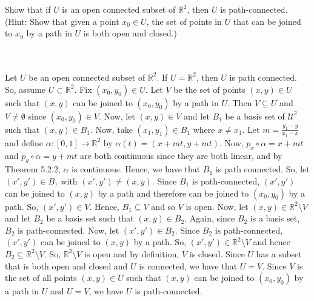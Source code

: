 Show that if $U$ is an open connected subset of $\mathbb{R}^2$, then $U$ is path-connected.
(Hint: Show that given a point $x_0\in U$, the set of points in $U$ that can be joined to $x_0$ by a
path in $U$ is both open and closed.)\\\\


\begin{solution}\renewcommand{\qedsymbol}{}\ \\
    Let $U$ be an open connected subset of $\mathbb{R}^2$. If $U=\mathbb{R}^2$, then $U$ is path
    connected. So, assume $U\subset\mathbb{R}^2$. Fix $(x_0,y_0)\in U$. Let $V$ be the set of points
    $(x,y)\in U$ such that $(x,y)$ can be joined to $(x_0,y_0)$ by a path in $U$. Then $V\subseteq U$
    and $V\neq\emptyset$ since $(x_0,y_0)\in V$. Now, let $(x,y)\in V$ and let $B_1$ be a basis set of
    $\mathcal{U}^2$ such that $(x,y)\in B_1$. Now, take $(x_1,y_1)\in B_1$ where $x\neq x_1$. Let
    $m=\frac{y_1-y}{x_1-x}$ and define $\alpha:[0,1]\rightarrow\mathbb{R}^2$ by $\alpha(t)=(x+mt,y+mt)$.
    Now, $p_x\circ\alpha=x+mt$ and $p_y\circ\alpha=y+mt$ are both continuous since they are both linear,
    and by Theorem 5.2.2, $\alpha$ is continuous. Hence, we have that $B_1$ is path connected. So, let
    $(x',y')\in B_1$ with $(x',y')\neq(x,y)$. Since $B_1$ is path-connected, $(x',y')$ can be joined to
    $(x,y)$ by a path and therefore can be joined to $(x_0,y_0)$ by a path. So, $(x',y')\in V$. Hence,
    $B_1\subseteq V$ and so $V$ is open. Now, let $(x,y)\in\mathbb{R}^2\setminus V$ and let $B_2$ be a
    basis set such that $(x,y)\in B_2$. Again, since $B_2$ is a basis set, $B_2$ is path-connected. Now,
    let $(x',y')\in B_2$. Since $B_2$ is path-connected, $(x',y')$ can be joined to $(x,y)$ by a path.
    So, $(x',y')\in\mathbb{R}^2\setminus V$ and hence $B_2\subseteq\mathbb{R}^2\setminus V$. So,
    $\mathbb{R}^2\setminus V$ is open and by definition, $V$ is closed. Since $U$ has a subset that is
    both open and closed and $U$ is connected, we have that $U=V$. Since $V$ is the set of all points
    $(x,y)\in U$ such that $(x,y)$ can be joined to $(x_0,y_0)$ by a path in $U$ and $U=V$, we have $U$
    is path-connected.

\end{solution}
